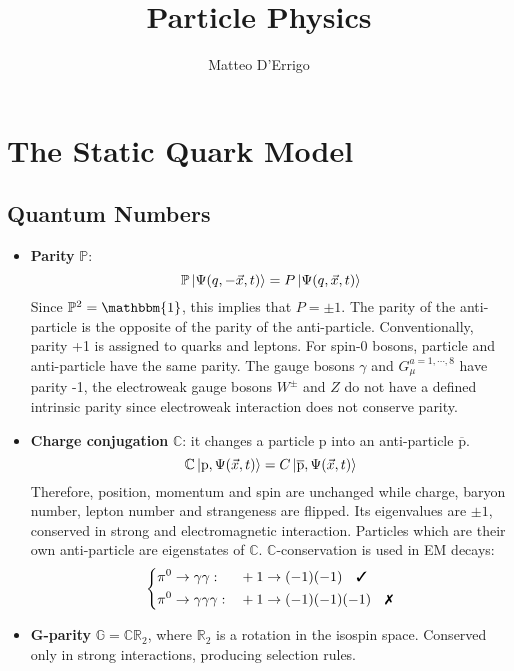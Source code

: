 \documentclass[10.75pt,a4paper,openright,bottom=2cm]{article}
\title{Particle Physics}
\author{Matteo D'Errigo}
\newcommand{\cmark}{\ding{51}}%
\newcommand{\xmark}{\ding{55}}%
\begin{document}
\maketitle
\tableofcontents
\newpage
\section{The Static Quark Model}
\subsection{Quantum Numbers}
\begin{itemize}
    \item \textbf{Parity} $\mathbb{P}$:
    \[
    \mathbb{P}\ket{\Psi(q,-\Vec{x},t)}=P\ket{\Psi(q,\Vec{x},t)}
    \]
    Since $\mathbb{P}^2=\mathbbm{1}$, this implies that $P=\pm1$. The parity of the anti-particle is the opposite of the parity of the anti-particle. Conventionally, parity +1 is assigned to quarks and leptons. For spin-0 bosons, particle and anti-particle have the same parity. The gauge bosons $\gamma$ and $G_\mu^{a=1,\cdots,8}$ have parity -1, the electroweak gauge bosons $W^\pm$ and $Z$ do not have a defined intrinsic parity since electroweak interaction does not conserve parity.
    \item \textbf{Charge conjugation} $\mathbb{C}$: it changes a particle p into an anti-particle $\overline{\text{p}}$.
    \[
    \mathbb{C}\ket{\text{p},\Psi(\Vec{x},t)}=C\ket{\overline{\text{p}},\Psi(\Vec{x},t)}
    \]
    Therefore, position, momentum and spin are unchanged while charge, baryon number, lepton number and strangeness are flipped. Its eigenvalues are $\pm1$, conserved in strong and electromagnetic interaction. Particles which are their own anti-particle are eigenstates of $\mathbb{C}$. $\mathbb{C}$-conservation is used in EM decays:
    \[
    \left\{
    \begin{aligned}
    &\pi^0\to\gamma\gamma: &&+1\to(-1)(-1) \quad \text{\cmark}\\
    &\pi^0\to\gamma\gamma\gamma: &&+1\to(-1)(-1)(-1) \quad \text{\xmark}
    \end{aligned}
    \right.
    \]
    \item \textbf{G-parity} $\mathbb{G}=\mathbb{C}\mathbb{R}_2$, where $\mathbb{R}_2$ is a rotation in the isospin space. Conserved only in strong interactions, producing selection rules.
\end{itemize}
\end{document}
